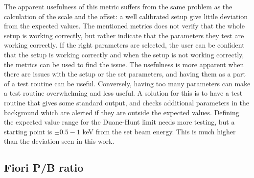 The apparent usefulness of this metric suffers from the same problem as the calculation of the scale and the offset: a well calibrated setup give little deviation from the expected values.
The mentioned metrics does not verify that the whole setup is working correctly, but rather indicate that the parameters they test are working correctly.
If the right parameters are selected, the user can be confident that the setup is working correctly and when the setup is not working correctly, the metrics can be used to find the issue.
The usefulness is more apparent when there are issues with the setup or the set parameters, and having them as a part of a test routine can be useful.
Conversely, having too many parameters can make a test routine overwhelming and less useful.
A solution for this is to have a test routine that gives some standard output, and checks additional parameters in the background which are alerted if they are outside the expected values.
Defining the expected value range for the Duane-Hunt limit needs more testing, but a starting point is $\pm 0.5-1$ keV \cite{goldstein_scanning_2018,software_dtsaii} from the set beam energy.
This is much higher than the deviation seen in this work.




\subsection{Fiori P/B ratio}
\label{discussion:fiori_peak_to_background_ratio}

